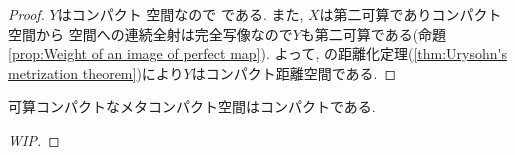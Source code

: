 \documentclass[uplatex, dvipdfmx, a4paper, 12pt, class=jsbook, crop=false]{standalone}
\begin{document}
\begin{proof}
	$ Y $はコンパクト \Hausdorff 空間なので  である.
	また, $ X $は第二可算でありコンパクト空間から \Hausdorff 空間への連続全射は完全写像なので$ Y $も第二可算である(命題 \ref{prop:Weight of an image of perfect map}).
	よって, \Urysohn の距離化定理(\ref{thm:Urysohn's metrization theorem})により$ Y $はコンパクト距離空間である.
\end{proof}

\begin{theorem}
	可算コンパクトなメタコンパクト空間はコンパクトである.
\end{theorem}

\begin{proof}
	[WIP]
\end{proof}
\end{document}
